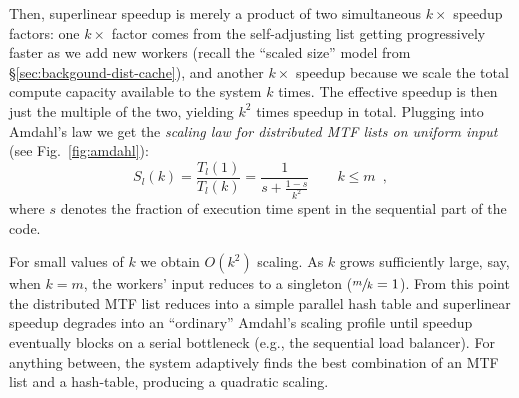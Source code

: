 Then, superlinear speedup is merely a product of two simultaneous $k\times$ speedup factors: one $k\times$ factor comes from the self-adjusting list getting progressively faster as we add new workers (recall the ``scaled size'' model from \S\ref{sec:backgound-dist-cache}), and another $k\times$ speedup because we scale the total compute capacity available to the system $k$ times. The effective speedup is then just the multiple of the two, yielding $k^2$ times speedup in total. Plugging into Amdahl's law we get the \emph{scaling law for distributed MTF lists on uniform input} (see Fig.~\ref{fig:amdahl}):
\begin{equation}\label{eq:mtf-perf}
  S_l(k) = \frac{T_l(1)}{T_l(k)} = \frac1{s + \frac{1-s}{k^2}} \qquad k \le m \enspace ,
\end{equation}
where $s$ denotes the fraction of execution time spent in the sequential part of the code.

For small values of $k$ we obtain $O(k^2)$ scaling. As $k$ grows sufficiently large, say, when $k=m$, the workers' input reduces to a singleton ($\sfrac{m}{k}=1$). From this point the distributed MTF list reduces into a simple parallel hash table and superlinear speedup degrades into an ``ordinary'' Amdahl's scaling profile until speedup eventually blocks on a serial bottleneck (e.g., the sequential load balancer).  For anything between, the system adaptively finds the best combination of an MTF list and a hash-table, producing a quadratic scaling.

